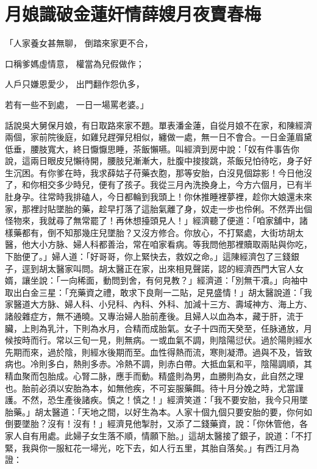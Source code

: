 %

\chapter{月娘識破金蓮奸情\KG 薛嫂月夜賣春梅}


\begin{showcontents}{}



「人家養女甚無聊，  倒踏來家更不合，

口稱爹媽虛情意，  權當為兒假做作；

人戶只嫌恩愛少，  出門翻作怨仇多，

若有一些不到處，  一日一場罵老婆。」

話說吳大舅保月娘，有日取路來家不題。單表潘金蓮，自從月娘不在家，和陳經濟兩個，家前院後庭，如雞兒趕彈兒相似，纏做一處，無一日不會合。一日金蓮眉黛低垂，腰肢寬大，終日懨懨思睡，茶飯懶嚥。叫經濟到房中說：「奴有件事告你說，這兩日眼皮兒懶待開，腰肢兒漸漸大，肚腹中捘捘跳，茶飯兒怕待吃，身子好生沉困。有你爹在時，我求薛姑子苻藥衣胞，那等安胎，白沒見個踪影！今日他沒了，和你相交多少時兒，便有了孩子。我從三月內洗換身上，今方六個月，已有半肚身孕。往常時我排磕人，今日都輪到我頭上！你休推睡裡夢裡，趁你大娘還未來家，那裡討貼墜胎的藥，趁早打落了這胎氣離了身，奴走一步也伶俐。不然弄出個怪物來，我就尋了無常罷了！再休想擡頭見人！」經濟聽了便道：「咱家舖中，諸樣藥都有，倒不知那幾庄兒墜胎？又沒方修合。你放心，不打緊處，大街坊胡太醫，他大小方脉、婦人科都善治，常在咱家看病。等我問他那裡贖取兩貼與你吃，下胎便了。」婦人道：「好哥哥，你上緊快去，救奴之命。」這陳經濟包了三錢銀子，逕到胡太醫家叫問。胡太醫正在家，出來相見聲諾，認的經濟西門大官人女婿，讓坐說：「一向稀面，動問到舍，有何見教？」經濟道：「別無干凟。」向袖中取出白金三星：「充藥資之禮，敢求下良劑一二貼，足見盛情！」胡太醫說道：「我家醫道大方脉、婦人科、小兒科、內科、外科、加減十三方、壽域神方、海上方、諸般雜症方，無不通曉。又專治婦人胎前產後。且婦人以血為本，藏于肝，流于臟，上則為乳汁，下則為水月，合精而成胎氣。女子十四而天癸至，任脉通放，月候按時而行。常以三旬一見，則無病。一或血氣不調，則陰陽愆伏。過於陽則經水先期而來，過於陰，則經水後期而至。血性得熱而流，寒則凝滯。過與不及，皆致病也。冷則多白，熱則多赤。冷熱不調，則赤白帶。大抵血氣和平，陰陽調順，其精血聚而包胎成。心腎二脉，應手而動。精盛則為男，血勝則為女，此自然之理也。胎前必須以安胎為本，如無他疾，不可妄服藥餌。待十月分娩之時，尤當謹護。不然，恐生產後諸疾。慎之！慎之！」經濟笑道：「我不要安胎，我今只用墜胎藥。」胡太醫道：「天地之間，以好生為本。人家十個九個只要安胎的要，你何如倒要墜胎？沒有！沒有！」經濟見他掣肘，又添了二錢藥資，說：「你休管他，各家人自有用處。此婦子女生落不順，情願下胎。」這胡太醫接了銀子，說道：「不打緊，我與你一服紅花一埽光，吃下去，如人行五里，其胎自落矣。」有西江月為證：


\end{showcontents}

